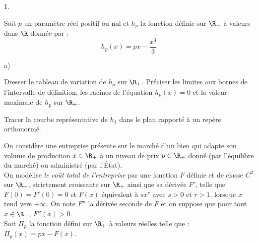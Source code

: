 \documentclass[11pt]{article}%
\begin{document}
\begin{noliste}{1.}
 \setlength{\itemsep}{4mm}

\item Soit $p$ un paramètre réel positif ou nul et $h_{p}$ la fonction
définie sur $\R_+ $ à valeurs dans $\R$ donnée par : 
\[
h_{p}(x) = p x - \frac{x^{3}}{3} 
\]

\begin{noliste}{a)}
 \setlength{\itemsep}{2mm}

\item Dresser le tableau de variation de $h_{p}$ sur $\R_+ $. Préciser
les limites aux bornes de l'intervalle de définition, les racines de
l'équation $h_{p}(x) = 0$ et la valeur maximale de $h_{p}$ sur $\R_+ $.
\\

\item Tracer la courbe représentative de $h_{1}$ dans le plan rapporté
à un repère orthonormé. 

\end{noliste}

\end{noliste}

\noindent On considère une entreprise présente sur le marché d'un bien
qui adapte son volume de production $x \in \R_+ $ à un niveau de prix
$p \in \R_+ $ donné (par l'équilibre du marché) ou administré (par
l'État). \\
On modélise \textit{le coût total de l'entreprise} par une fonction $F$
définie et de classe $C^{2}$ sur $\R_+ $, strictement croissante sur
$\R_+ $ ainsi que sa dérivée $F'$, telle que $F(0) = F'(0) = 0$ et
$F(x)$ équivalent à $s x^{r}$ avec $s > 0$ et $r > 1$, lorsque $x$ tend
vers $ + \infty$. On note $F''$ la dérivée seconde de $F$ et on suppose
que pour tout $x \in \R_+ $, $F''(x) > 0$. \\
Soit $\Pi_{p}$ la fonction défini sur $\R_+ $ à valeurs réelles telle
que : $\Pi_{p}(x) = p x - F (x)$.
\end{document}
